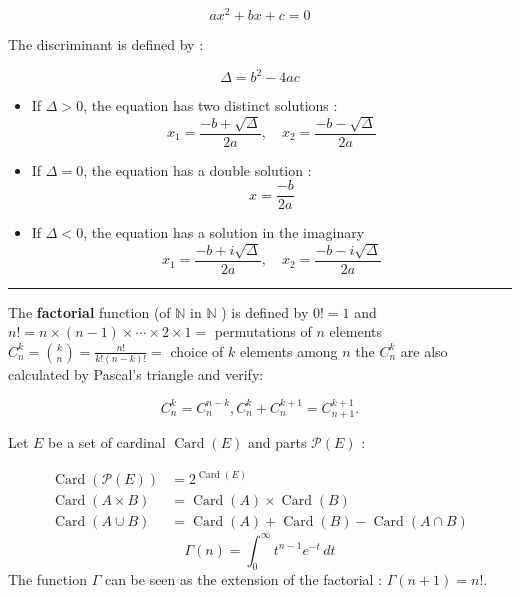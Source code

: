 \begin{f}  
     \[
    ax^2 + bx + c = 0
    \]

    The discriminant is defined by :
    
    \[
    \Delta = b^2 - 4ac
    \]
       
    \begin{itemize}
        \item If \(\Delta > 0\), the equation has two distinct solutions :
        \[
        x_1 = \frac{-b + \sqrt{\Delta}}{2a}, \quad x_2 = \frac{-b - \sqrt{\Delta}}{2a}
        \]
        \item If \(\Delta = 0\), the equation has a double solution :
        \[
        x = \frac{-b}{2a}
        \]
        \item If \(\Delta < 0\), the equation has a solution in the imaginary
        \[
        x_1 = \frac{-b + i\sqrt{\Delta}}{2a}, \quad x_2 = \frac{-b - i\sqrt{\Delta}}{2a}
        \]
    \end{itemize}
\end{f}
\hrule
\begin{f}  

The \textbf{factorial} function (of \(\mathbb{N}\) in \(\mathbb{N}\) ) is defined by \(0!=1\) and \(n!=n \times(n-1) \times \cdots \times 2 \times 1=\) permutations of \(n\) elements \(\displaystyle C_n^k=\binom{k}{n}=\frac{n!}{k!(n-k)!}=\) choice of \(k\) elements among \(n\) the \(C_n^k\) are also calculated by Pascal's triangle and verify:

\[
C_n^k=C_n^{n-k}, C_n^k+C_n^{k+1}=C_{n+1}^{k+1} .
\]


Let \(E\) be a set of cardinal \(\operatorname{Card}(E)\) and parts \(\mathcal{P}(E)\) :

\[
\begin{aligned}
\operatorname{Card}(\mathcal{P}(E)) & =2^{\operatorname{Card}(E)} \\
\operatorname{Card}(A \times B) & =\operatorname{Card}(A) \times \operatorname{Card}(B) \\
\operatorname{Card}(A \cup B) & =\operatorname{Card}(A)+\operatorname{Card}(B)-\operatorname{Card}(A \cap B)
\end{aligned}
\]
\[ \Gamma(n) = \int_0^\infty t^{n-1} e^{-t} \, dt \]
The function \(\Gamma\) can be seen as the extension of the factorial : \(\Gamma(n+1)=n!\).
\end{f}

